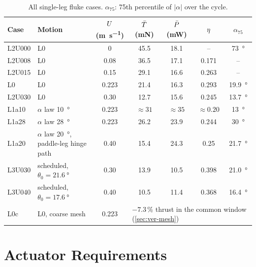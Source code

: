 \begin{table}[H]
  \centering
  \caption[All fluke cases]{All single-leg fluke cases. $\alpha_{75}$: 75th percentile of $|\alpha|$ over the cycle.}
  \label{tab:app-fluke}
  \footnotesize
  \setlength{\tabcolsep}{5pt}
  \begin{tabular}{@{}llccccc@{}}
    \toprule
    Case & Motion & $U$ (\si{\metre\per\second}) & $\bar{T}$ (mN) & $\bar{P}$ (mW) & $\eta$ & $\alpha_{75}$ \\
    \midrule
    L2U000 & L0 & 0     & 45.5 & 18.1 & --    & \SI{73}{\degree} \\
    L2U008 & L0 & 0.08  & 36.5 & 17.1 & 0.171 & -- \\
    L2U015 & L0 & 0.15  & 29.1 & 16.6 & 0.263 & -- \\
    L0     & L0 & 0.223 & 21.4 & 16.3 & 0.293 & \SI{19.9}{\degree} \\
    L2U030 & L0 & 0.30  & 12.7 & 15.6 & 0.245 & \SI{13.7}{\degree} \\
    L1a10  & $\alpha$ law \SI{10}{\degree} & 0.223 & $\approx31$ & $\approx35$ & $\approx0.20$ & \SI{13}{\degree} \\
    L1a28  & $\alpha$ law \SI{28}{\degree} & 0.223 & 26.2 & 23.9 & 0.244 & \SI{30}{\degree} \\
    L1a20  & $\alpha$ law \SI{20}{\degree}, paddle-leg hinge path & 0.40 & 15.4 & 24.3 & 0.25 & \SI{21.7}{\degree} \\
    L3U030 & scheduled, $\theta_0=\SI{21.6}{\degree}$ & 0.30 & 13.9 & 10.5 & 0.398 & \SI{21.0}{\degree} \\
    L3U040 & scheduled, $\theta_0=\SI{17.6}{\degree}$ & 0.40 & 10.5 & 11.4 & 0.368 & \SI{16.4}{\degree} \\
    L0c    & L0, coarse mesh & 0.223 & \multicolumn{4}{l}{$-7.3$\,\% thrust in the common window (\cref{sec:ver-mesh})} \\
    \bottomrule
  \end{tabular}
\end{table}

\section{Actuator Requirements}
\label{app:actuators}

